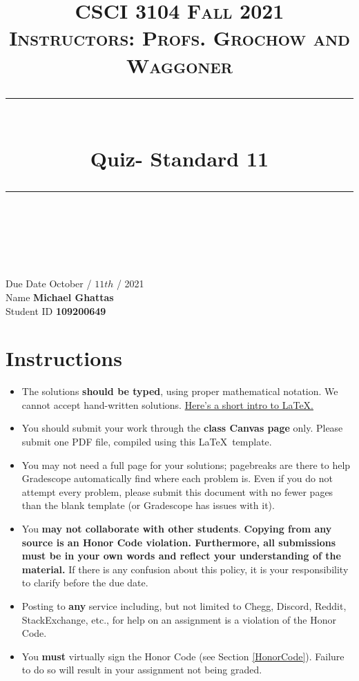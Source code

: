 \documentclass[11pt]{article}
\title{
\normalfont \normalsize 
\textsc{CSCI 3104 Fall 2021 \\ 
Instructors: Profs. Grochow and Waggoner} \\
[10pt] 
\rule{\linewidth}{0.5pt} \\[6pt] 
\huge Quiz- Standard 11 \\
\rule{\linewidth}{2pt}  \\[10pt]
}
\date{}
\theoremstyle{definition}
\theoremstyle{definition}
\theoremstyle{definition}
\begin{document}

\maketitle


\noindent
Due Date \dotfill October / $11{th}$ / 2021 \\
Name \dotfill \textbf{Michael Ghattas} \\
Student ID \dotfill \textbf{109200649} \\


\tableofcontents

\section{Instructions}
 \begin{itemize}
	\item The solutions \textbf{should be typed}, using proper mathematical notation. We cannot accept hand-written solutions. \href{http://ece.uprm.edu/~caceros/latex/introduction.pdf}{Here's a short intro to \LaTeX.}
	\item You should submit your work through the \textbf{class Canvas page} only. Please submit one PDF file, compiled using this \LaTeX \ template.
	\item You may not need a full page for your solutions; pagebreaks are there to help Gradescope automatically find where each problem is. Even if you do not attempt every problem, please submit this document with no fewer pages than the blank template (or Gradescope has issues with it).

	\item You \textbf{may not collaborate with other students}. \textbf{Copying from any source is an Honor Code violation. Furthermore, all submissions must be in your own words and reflect your understanding of the material.} If there is any confusion about this policy, it is your responsibility to clarify before the due date. 

	\item Posting to \textbf{any} service including, but not limited to Chegg, Discord, Reddit, StackExchange, etc., for help on an assignment is a violation of the Honor Code.

	\item You \textbf{must} virtually sign the Honor Code (see Section \ref{HonorCode}). Failure to do so will result in your assignment not being graded.
\end{itemize}
\end{document}
